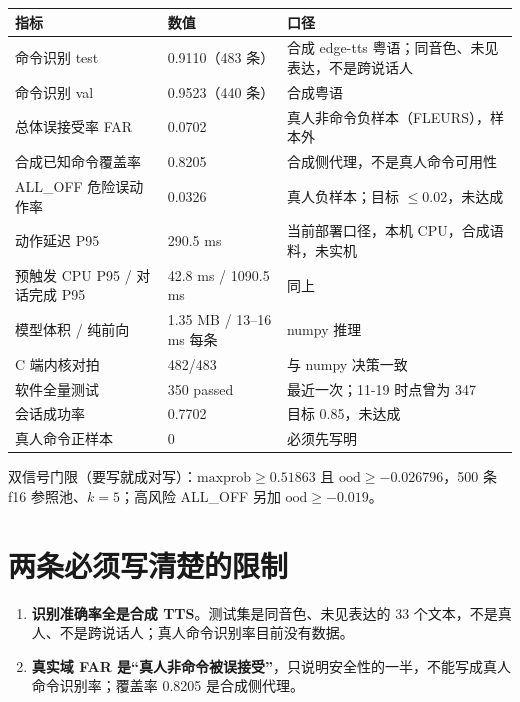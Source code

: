 \documentclass[UTF8,a4paper,11pt,fontset=fandol]{ctexart}
\begin{document}
\begin{table}[H]
  \centering
  \small
  \begin{tabularx}{\textwidth}{@{}lXX@{}}
    \toprule
    指标 & 数值 & 口径 \\
    \midrule
    命令识别 test & 0.9110（483 条） & 合成 edge-tts 粤语；同音色、未见表达，不是跨说话人 \\
    命令识别 val & 0.9523（440 条） & 合成粤语 \\
    总体误接受率 FAR & 0.0702 & 真人非命令负样本（FLEURS），样本外 \\
    合成已知命令覆盖率 & 0.8205 & 合成侧代理，不是真人命令可用性 \\
    ALL\_OFF 危险误动作率 & 0.0326 & 真人负样本；目标 $\le 0.02$，未达成 \\
    动作延迟 P95 & 290.5 ms & 当前部署口径，本机 CPU，合成语料，未实机 \\
    预触发 CPU P95 / 对话完成 P95 & 42.8 ms / 1090.5 ms & 同上 \\
    模型体积 / 纯前向 & 1.35 MB / 13--16 ms 每条 & numpy 推理 \\
    C 端内核对拍 & 482/483 & 与 numpy 决策一致 \\
    软件全量测试 & 350 passed & 最近一次；11-19 时点曾为 347 \\
    会话成功率 & 0.7702 & 目标 0.85，未达成 \\
    真人命令正样本 & 0 & 必须先写明 \\
    \bottomrule
  \end{tabularx}
\end{table}

双信号门限（要写就成对写）：$\text{maxprob} \ge 0.51863$ 且 $\text{ood} \ge -0.026796$，500 条 f16 参照池、$k=5$；高风险 ALL\_OFF 另加 $\text{ood} \ge -0.019$。

\section{两条必须写清楚的限制}

\begin{enumerate}[leftmargin=2em]
  \item \textbf{识别准确率全是合成 TTS}。测试集是同音色、未见表达的 33 个文本，不是真人、不是跨说话人；真人命令识别率目前没有数据。
  \item \textbf{真实域 FAR 是“真人非命令被误接受”}，只说明安全性的一半，不能写成真人命令识别率；覆盖率 0.8205 是合成侧代理。
\end{enumerate}
\end{document}
